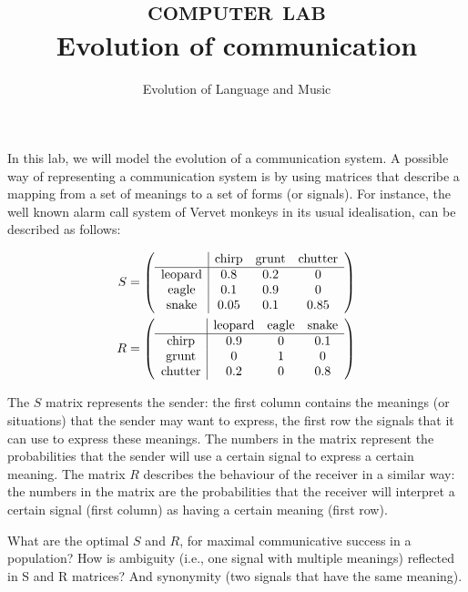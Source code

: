 \documentclass[a4paper, 9pt]{article}
\title{\textsc{computer lab}\\ \textbf{Evolution of communication}}
\author{Evolution of Language and Music}
\date{\date{}}
\begin{document}
\maketitle
{}

\noindent
In this lab, we will model the evolution of a
communication system. A possible way of representing a communication
system is by using matrices that describe a mapping from a set of
meanings to a set of forms (or signals). For instance, the well known
alarm call system of Vervet monkeys \cite{seyfarth1980monkey} in its
usual idealisation, can be described as follows:

\begin{align*}\footnotesize
S &=
  \left(
  \begin{array}{c|ccc}
  & \text{chirp} & \text{grunt} & \text{chutter}\\
  \hline
  \text{leopard} & 0.8 & 0.2 & 0\\
  \text{eagle} & 0.1 & 0.9 & 0\\
  \text{snake} & 0.05 & 0.1 & 0.85 \\
  \end{array}
  \right)
  \\
R &=
  \left(
  \begin{array}{c|ccc}
  & \text{leopard} & \text{eagle} & \text{snake}\\
  \hline
  \text{chirp} & 0.9 & 0 & 0.1\\
  \text{grunt} & 0 & 1 & 0\\
  \text{chutter} & 0.2 & 0 & 0.8\\
  \end{array}
  \right)
\end{align*}

The $S$ matrix represents the sender: the first column contains the
meanings (or situations) that the sender may want to express, the first
row the signals that it can use to express these meanings. The numbers
in the matrix represent the probabilities that the sender will use a
certain signal to express a certain meaning. The matrix $R$ describes
the behaviour of the receiver in a similar way: the numbers in the
matrix are the probabilities that the receiver will interpret a certain
signal (first column) as having a certain meaning (first row).

\begin{exercise}
\askstar What are the optimal $S$ and $R$, for maximal communicative success in a population?
\askstar How is ambiguity (i.e., one signal with multiple meanings) reflected in S and R matrices? And synonymity (two signals that have the same meaning).
\end{exercise}
\end{document}
